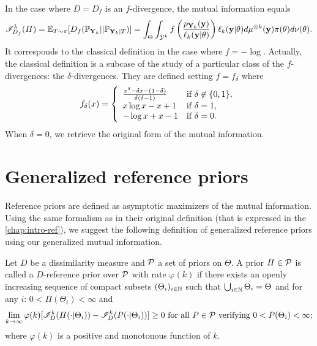 In the case where $D=D_f$ is an $f$-divergence, the mutual information equals
    \begin{equation}
        \mathscr{I}_{D_f}^k(\varPi) =\mathbb{E}_{T\sim\pi}[D_f(\mathbb{P}_{\mathbf{Y}_k}||\mathbb{P}_{\mathbf{Y}_k|T})] = \int_\Theta\int_{\mathcal{Y}^k}f\left( \frac{p_{\mathbf{Y}_k}(\mathbf{y})}{\ell_k(\mathbf{y}|\theta)} \right) \ell_k(\mathbf{y}|\theta)d\mu^{\otimes k}(\mathbf{y}) \pi(\theta)d\nu(\theta).
    \end{equation}
It corresponds to  the classical definition in the case where $f=-\log$. Actually, the classical definition is a subcase of the study of a particular class of the $f$-divergences:  the $\delta$-divergences. They are defined setting $f=f_\delta$ where 
\begin{equation}
    f_\delta(x) = \left\lbrace\begin{array}{l l} \frac{x^\delta-\delta x-(1-\delta)}{\delta(\delta-1)} & \text{if\ }\delta\not\in\{0,1\},\\ 
        x\log x-x+1  & \text{if\ }\delta=1, \\
        -\log x +x -1 & \text{if\ }\delta=0.
    \end{array}\right. 
\end{equation}    
When $\delta=0$, we retrieve the original form of the mutual information.


\section{Generalized reference priors}\label{sec:PSGSA:generefp}


Reference priors are defined as asymptotic maximizers of the mutual information. Using the same formalism as in their original definition (that is expressed in the \cref{chap:intro-ref}), we suggest the following definition of generalized reference priors using our generalized mutual information.

\begin{defi}\label{def:genref}
    Let $D$ be a dissimilarity measure and $\mathcal{P}$ a set of priors on $\Theta$. A prior $\varPi\in\mathcal{P}$ is called a $D$-reference prior over $\mathcal{P}$ with rate $\varphi(k)$ if there exists an openly increasing  sequence of compact subsets $(\Theta_i)_{i\in\mathbb{N}}$
    such that $\bigcup_{i\in\mathbb{N}}\Theta_i=\Theta$ and for any $i$: $0<\varPi(\Theta_i)<\infty $ and
        \begin{equation}\label{eq:defrefpriorsi}
            \lim_{k\rightarrow\infty}\varphi(k)[\sI^k_D(\varPi(\cdot|\Theta_i))-\sI^k_D(P(\cdot|\Theta_i))] \geq0 \text{\ for all\ } P\in\cP\text{\ verifying\ }0<P(\Theta_i)<\infty;
        \end{equation}
    where  $\varphi(k)$ is a {positive and}  monotonous function of $k$.
\end{defi}


